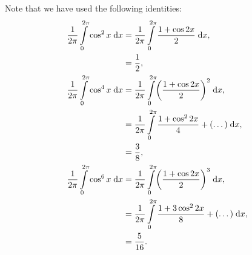 \documentclass[11pt,
        usenames, %
        dvipsnames %
    ]{article}
\DeclarePairedDelimiter\p{\lparen}{\rparen}
\begin{document}
Note that we have used the following identities:
\begin{align}
    \frac{1}{2\pi}\int\limits_0^{2\pi}\cos^2x\;\mathrm{d}x
        &= \frac{1}{2\pi}
            \int\limits_0^{2\pi}\frac{1 + \cos 2x}{2}\;\mathrm{d}x,\nonumber\\
        &= \frac{1}{2},\\
    \frac{1}{2\pi}\int\limits_0^{2\pi}\cos^4x\;\mathrm{d}x
        &= \frac{1}{2\pi}
            \int\limits_0^{2\pi}\p*{\frac{1 + \cos 2x}{2}}^2\;\mathrm{d}x
                ,\nonumber\\
        &= \frac{1}{2\pi}
            \int\limits_0^{2\pi}\frac{1 + \cos^2 2x}{4}
                + (\dots)\;\mathrm{d}x,\nonumber\\
        &= \frac{3}{8},\\
    \frac{1}{2\pi}\int\limits_0^{2\pi}\cos^6x\;\mathrm{d}x
        &= \frac{1}{2\pi}
            \int\limits_0^{2\pi}\p*{\frac{1 + \cos 2x}{2}}^3\;\mathrm{d}x
                ,\nonumber\\
        &= \frac{1}{2\pi}
            \int\limits_0^{2\pi}\frac{1 + 3\cos^2 2x}{8}
                 + (\dots)\;\mathrm{d}x,\nonumber\\
        &= \frac{5}{16}.
\end{align}
\end{document}
